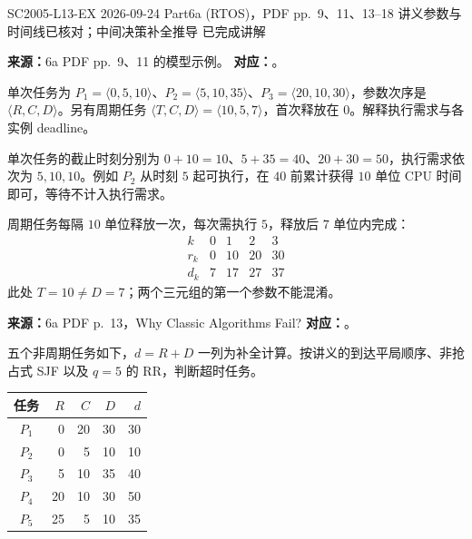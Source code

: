 

\examplemeta
  {SC2005-L13-EX}
  {2026-09-24}
  {Part6a (RTOS)，PDF pp.~9、11、13--18}
  {讲义参数与时间线已核对；中间决策补全推导}
  {已完成讲解}


\textbf{来源：}6a PDF pp.~9、11 的模型示例。\quad
\textbf{对应：}。

单次任务为 $P_1=\langle0,5,10\rangle$、$P_2=\langle5,10,35\rangle$、$P_3=\langle20,10,30\rangle$，参数次序是 $\langle R,C,D\rangle$。另有周期任务 $\langle T,C,D\rangle=\langle10,5,7\rangle$，首次释放在 $0$。解释执行需求与各实例 deadline。

\begin{checkedsolution}
单次任务的截止时刻分别为 $0+10=10$、$5+35=40$、$20+30=50$，执行需求依次为 $5,10,10$。例如 $P_2$ 从时刻 $5$ 起可执行，在 $40$ 前累计获得 $10$ 单位 CPU 时间即可，等待不计入执行需求。

周期任务每隔 $10$ 单位释放一次，每次需执行 $5$，释放后 $7$ 单位内完成：
\[
\begin{array}{c|rrrr}
  k&0&1&2&3\\\hline
  r_k&0&10&20&30\\
  d_k&7&17&27&37
\end{array}
\]
此处 $T=10\ne D=7$；两个三元组的第一个参数不能混淆。
\end{checkedsolution}


\textbf{来源：}6a PDF p.~13，Why Classic Algorithms Fail?\quad
\textbf{对应：}。

五个非周期任务如下，$d=R+D$ 一列为补全计算。按讲义的到达平局顺序、非抢占式 SJF 以及 $q=5$ 的 RR，判断超时任务。
\begin{center}
\begin{tabular}{@{}crrrr@{}}
\toprule
任务 & $R$ & $C$ & $D$ & $d$ \\
\midrule
$P_1$ & 0 & 20 & 30 & 30 \\
$P_2$ & 0 & 5 & 10 & 10 \\
$P_3$ & 5 & 10 & 35 & 40 \\
$P_4$ & 20 & 10 & 30 & 50 \\
$P_5$ & 25 & 5 & 10 & 35 \\
\bottomrule
\end{tabular}
\end{center}

